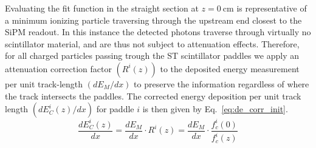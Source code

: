Evaluating the fit function in the straight section at $z = 0\ \mathrm{cm}$ is representative of a minimum ionizing particle traversing through the upstream end closest to the SiPM readout.  In this instance the detected photons traverse through virtually no scintillator material, and are thus not subject to attenuation effects.  Therefore, for all charged particles passing trough the ST scintillator paddles we apply an attenuation correction factor $(R^{i}(z))$ to the deposited energy measurement per unit track-length $(dE_{M} / dx)$ to preserve the information regardless of where the track intersects the paddles. The corrected energy deposition per unit track length $(dE^{i}_{C}(z) / dx)$ for paddle $i$ is then given by Eq.~\ref{eq:de_corr_init}. 
	\begin{equation} \label{eq:de_corr_init}
	\dfrac{dE^{i}_{C} (z)}{dx} = \dfrac{dE_{M}}{dx} \cdot R^{i}(z) = \dfrac{dE_{M}}{dx} \cdot \dfrac{f^{i}_{c}(0)}{f^{i}_{c}(z)}
	\end{equation}
	
	





%
